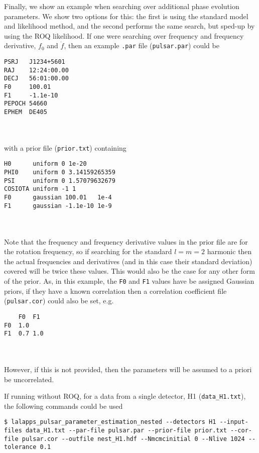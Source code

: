Finally, we show an example when searching over additional phase evolution parameters. We show two options for this: the first is using the standard
model and likelihood method, and the second performs the same search, but sped-up by using the ROQ likelihood. If one were searching over frequency and
frequency derivative, $f_0$ and $\dot{f}$, then an example {\tt .par} file ({\tt pulsar.par}) could be
\begin{lrbox}{\Lst}
\begin{lstlisting}
PSRJ   J1234+5601
RAJ    12:24:00.00
DECJ   56:01:00.00
F0     100.01
F1     -1.1e-10
PEPOCH 54660
EPHEM  DE405
\end{lstlisting}
\end{lrbox}
\\[5pt] \indent \fbox{\usebox{\Lst}} \\[5pt]
with a prior file ({\tt prior.txt}) containing
\begin{lrbox}{\Lst}
\begin{lstlisting}
H0      uniform 0 1e-20
PHI0    uniform 0 3.14159265359
PSI     uniform 0 1.57079632679
COSIOTA uniform -1 1
F0      gaussian 100.01   1e-4
F1      gaussian -1.1e-10 1e-9
\end{lstlisting}
\end{lrbox}
\\[5pt] \indent \fbox{\usebox{\Lst}} \\[5pt]
Note that the frequency and frequency derivative values in the prior file are for the rotation frequency, so if searching for the standard $l=m=2$
harmonic then the actual frequencies and derivatives (and in this case their standard deviation) covered will be twice these values. This would also
be the case for any other form of the prior. As, in this example, the {\tt F0} and {\tt F1} values have be assigned Gaussian priors, if they have a
known correlation then a correlation coefficient file ({\tt pulsar.cor}) could also be set, e.g.\
\begin{lrbox}{\Lst}
\begin{lstlisting}
    F0  F1
F0  1.0
F1  0.7 1.0
\end{lstlisting}
\end{lrbox}
\\[5pt] \indent \fbox{\usebox{\Lst}} \\[5pt]
However, if this is not provided, then the parameters will be assumed to a priori be uncorrelated.

If running without ROQ, for a data from a single detector, H1 ({\tt data\_H1.txt}), the following commands could be used
\begin{lstlisting}[frame=single]
$ lalapps_pulsar_parameter_estimation_nested --detectors H1 --input-files data_H1.txt --par-file pulsar.par --prior-file prior.txt --cor-file pulsar.cor --outfile nest_H1.hdf --Nmcmcinitial 0 --Nlive 1024 --tolerance 0.1
\end{lstlisting}

